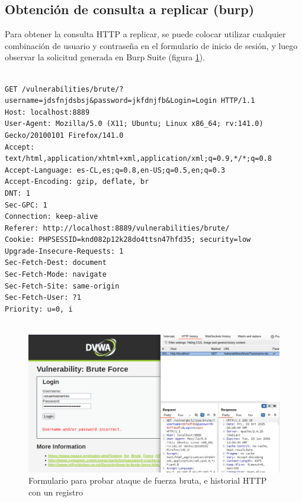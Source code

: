 \documentclass[letterpaper,12pt]{article}
\let\origsubsection\subsection
\renewcommand{\subsection}{\FloatBarrier\origsubsection}
\begin{document}
\subsection{Obtención de consulta a replicar (burp)}
Para obtener la consulta HTTP a replicar, se puede colocar utilizar cualquier combinación de usuario y contraseña en el formulario de inicio de sesión, y luego observar la solicitud generada en Burp Suite (figura \ref{fig:sidetoside}).
\begin{verbatim}

GET /vulnerabilities/brute/?username=jdsfnjdsbsj&password=jkfdnjfb&Login=Login HTTP/1.1
Host: localhost:8889
User-Agent: Mozilla/5.0 (X11; Ubuntu; Linux x86_64; rv:141.0) Gecko/20100101 Firefox/141.0
Accept: text/html,application/xhtml+xml,application/xml;q=0.9,*/*;q=0.8
Accept-Language: es-CL,es;q=0.8,en-US;q=0.5,en;q=0.3
Accept-Encoding: gzip, deflate, br
DNT: 1
Sec-GPC: 1
Connection: keep-alive
Referer: http://localhost:8889/vulnerabilities/brute/
Cookie: PHPSESSID=knd082p12k28do4ttsn47hfd35; security=low
Upgrade-Insecure-Requests: 1
Sec-Fetch-Dest: document
Sec-Fetch-Mode: navigate
Sec-Fetch-Site: same-origin
Sec-Fetch-User: ?1
Priority: u=0, i


\end{verbatim}
\begin{figure}
    \centering
    \includegraphics[width=1\linewidth]{Captura desde 2025-10-02 23-41-56.png}
    \caption{Formulario para probar ataque de fuerza bruta, e historial HTTP con un registro}
    \label{fig:sidetoside}
\end{figure}
\end{document}
